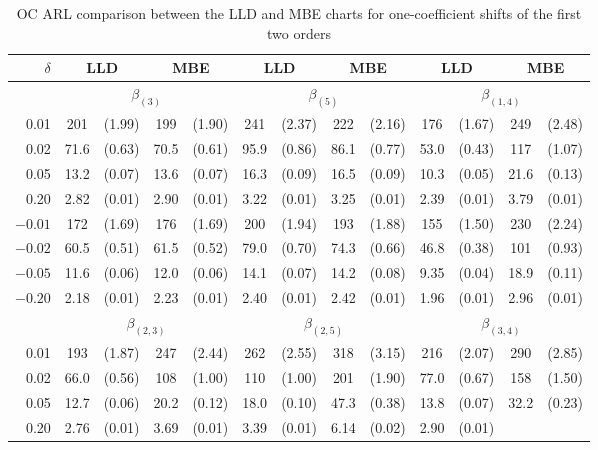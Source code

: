 \begin{table}[!ht]
\tabcolsep 4.5pt \vspace{-0.1cm} \centering \caption{OC ARL comparison between the
LLD and MBE charts for one-coefficient shifts of the first two orders}
\vspace{0.3cm}
\renewcommand{\arraystretch}{1.25}
\begin{tabular}{r|cccc|cccc|cccc}\hline
$\delta$ & \multicolumn{2}{c}{LLD} & \multicolumn{2}{c|}{MBE} &
\multicolumn{2}{c}{LLD} & \multicolumn{2}{c|}{MBE} & \multicolumn{2}{c}{LLD} &
\multicolumn{2}{c}{MBE}
\\\hline
& \multicolumn{4}{c|}{$\beta_{(3)}$} & \multicolumn{4}{c|}{$\beta_{(5)}$} &
\multicolumn{4}{c}{$\beta_{(1,4)}$}
\\\hline
0.01 & 201 & (1.99) & 199 & (1.90) & 241 & (2.37) & 222 & (2.16) & 176 & (1.67) &
249 & (2.48)
\\
0.02 & 71.6 & (0.63) & 70.5 & (0.61) & 95.9 & (0.86) & 86.1 & (0.77) & 53.0 & (0.43)
& 117 & (1.07)
\\
0.05 & 13.2 & (0.07) & 13.6 & (0.07) & 16.3 & (0.09) & 16.5 & (0.09) & 10.3 & (0.05)
& 21.6 & (0.13)
\\
0.20 & 2.82 & (0.01) & 2.90 & (0.01) & 3.22 & (0.01) & 3.25 & (0.01) & 2.39 & (0.01)
& 3.79 & (0.01)
\\
$-0.01$ & 172 & (1.69) & 176 & (1.69) & 200 & (1.94) & 193 & (1.88) & 155 & (1.50) &
230 & (2.24)
\\
$-0.02$ & 60.5 & (0.51) & 61.5 & (0.52) & 79.0 & (0.70) & 74.3 & (0.66) & 46.8 &
(0.38) & 101 & (0.93)
\\
$-0.05$ & 11.6 & (0.06) & 12.0 & (0.06) & 14.1 & (0.07) & 14.2 & (0.08) & 9.35 &
(0.04) & 18.9 & (0.11)
\\
$-0.20$ & 2.18 & (0.01) & 2.23 & (0.01) & 2.40 & (0.01) & 2.42 & (0.01) & 1.96 &
(0.01) & 2.96 & (0.01)
\\\hline
& \multicolumn{4}{c|}{$\beta_{(2,3)}$} & \multicolumn{4}{c|}{$\beta_{(2,5)}$} &
\multicolumn{4}{c}{$\beta_{(3,4)}$}
\\\hline
0.01 & 193 & (1.87) & 247 & (2.44) & 262 & (2.55) & 318 & (3.15) & 216 & (2.07) &
290 & (2.85)
\\
0.02 & 66.0 & (0.56) & 108 & (1.00) & 110 & (1.00) & 201 & (1.90) & 77.0 & (0.67) &
158 & (1.50)
\\
0.05 & 12.7 & (0.06) & 20.2 & (0.12) & 18.0 & (0.10) & 47.3 & (0.38) & 13.8 & (0.07)
& 32.2 & (0.23)
\\
0.20 & 2.76 & (0.01) & 3.69 & (0.01) & 3.39 & (0.01) & 6.14 & (0.02) & 2.90 & (0.01)

\end{tabular}
\end{table}
